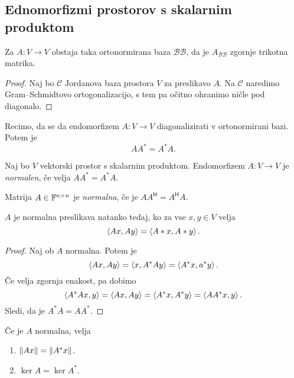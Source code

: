 \documentclass[12pt, a4paper]{article}
\begin{document}
\newpage

\subsection{Ednomorfizmi prostorov s skalarnim produktom}

\begin{izrek}[Schur]
Za $A\colon V\to V$ obstaja taka ortonormirana baza $\mathcal{BB}$, da je $A_{\mathcal{BB}}$ zgornje trikotna matrika.
\end{izrek}

\begin{proof}
Naj bo $\mathcal{C}$ Jordanova baza prostora $V$ za preslikavo $A$. Na $\mathcal{C}$ naredimo Gram--Schmidtovo ortogonalizacijo, s tem pa očitno ohranimo ničle pod diagonalo.
\end{proof}

\begin{opomba}
Recimo, da se da endomorfizem $A\colon V\to V$ diagonalizirati v ortonormirani bazi. Potem je
\[
AA^*=A^*A.
\]
\end{opomba}

\begin{definicija}
Naj bo $V$ vektorski prostor s skalarnim produktom. Endomorfizem $A\colon V\to V$ je \emph{normalen}, če velja $AA^*=A^*A$.
\end{definicija}

\begin{definicija}
Matrija $A\in\mathbb{F}^{n\times n}$ je \emph{normalna}, če je $AA^\mathsf{H}=A^\mathsf{H}A$.
\end{definicija}

\begin{trditev}
$A$ je normalna preslikava natanko tedaj, ko za vse $x,y\in V$ velja
\[
\left\langle Ax,Ay\right\rangle=\left\langle A*x,A*y\right\rangle.
\]
\end{trditev}

\begin{proof}
Naj ob $A$ normalna. Potem je
\[
\left\langle Ax,Ay\right\rangle=\left\langle x,A^*Ay\right\rangle=\left\langle A^*x,a^*y\right\rangle.
\]
Če velja zgornja enakost, pa dobimo
\[
\left\langle A^*Ax,y\right\rangle=\left\langle Ax,Ay\right\rangle=\left\langle A^*x,A^*y\right\rangle=\left\langle AA^*x,y\right\rangle.
\]
Sledi, da je $A^*A=AA^*$.
\end{proof}

\begin{posledica}
Če je $A$ normalna, velja

\begin{enumerate}[label=\alph*)]
\item $\left\lVert Ax\right\rVert=\left\lVert A^*x\right\rVert$.
\item $\ker A=\ker A^*$.
\end{enumerate}
\end{posledica}
\end{document}
